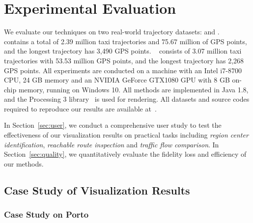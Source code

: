 \section{Experimental Evaluation}\label{sec:exp}


We evaluate our techniques on two real-world trajectory datasets: \pt{} and \sz{}.
\pt{}~\cite{pt} contains a total of 2.39 million taxi trajectories and 75.67 million of GPS points, and the longest trajectory has 3,490 GPS points.
\sz{}~\cite{sz} consists of 3.07 million taxi trajectories with 53.53 million GPS points, and the longest trajectory has 2,268 GPS points. All experiments are conducted on a machine with an Intel i7-8700 CPU, 24 GB memory and an NVIDIA GeForce GTX1080 GPU with 8 GB on-chip memory, running on Windows 10. All methods are implemented in Java 1.8, and the Processing 3 library~\cite{p3} is used for rendering. All datasets and source codes required to reproduce our results are available at~\cite{code}.

In Section~\ref{sec:user}, we conduct a comprehensive user study to test the effectiveness of our visualization results on practical  tasks including \textit{region center identification}, \textit{reachable route inspection} and \textit{traffic flow comparison}. In Section~\ref{sec:quality}, we quantitatively evaluate the fidelity loss and efficiency of our methods.


\subsection{Case Study of Visualization Results}\label{sec:case}

\subsubsection{Case Study on Porto}\label{sec:pt}


